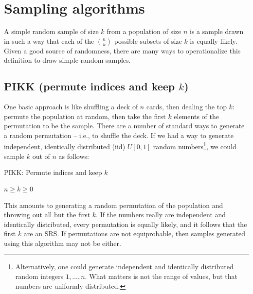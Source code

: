 \documentclass[12pt]{article}
\begin{document}



\appendix


\section{Sampling algorithms}\label{sec:algorithms}
A simple random sample of size $k$ from a population of size $n$ is a sample drawn in such a way that each of the ${n \choose k}$ possible subsets of size $k$ is equally likely.
Given a good source of randomness, there are many ways to operationalize this definition to draw simple random samples.

\subsection{PIKK (permute indices and keep $k$)}
One basic approach is like shuffling a deck of $n$ cards, then dealing the top $k$: permute the population at random, then take the first $k$ elements of the permutation to be the sample.
There are a number of standard ways to generate a random permutation -- i.e., to shuffle the deck.
If we had a way to generate independent, identically distributed (iid) $U[0,1]$ random numbers\footnote{
Alternatively, one could generate independent and identically distributed random integers $1, \dots, n$.
What matters is not the range of values, but that numbers are uniformly distributed.}, we could sample $k$ out of $n$ as follows:

\begin{algorithm}                      %
\caption{PIKK: Permute indices and keep $k$}          %
\label{PIKK}                           %
\begin{algorithmic}[1]               %
    \Require $n \geq k \geq 0$
    \Statex
\end{algorithmic}
\end{algorithm}

This amounts to generating a random permutation of the population and throwing out all but the first $k$.
If the numbers really are independent and identically distributed, every permutation is equally likely, and it follows that the first $k$ are an SRS.
If permutations are not equiprobable, then samples generated using this algorithm may not be either.
\end{document}
